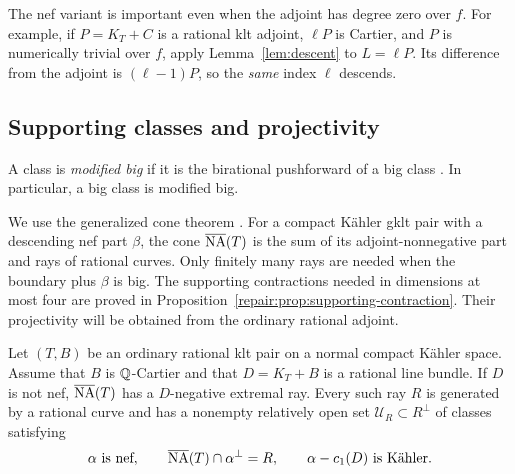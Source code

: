 The nef variant is important even when the adjoint has degree zero over
$f$.  For example, if $P=K_T+C$ is a rational klt adjoint, $\ell P$ is
Cartier, and $P$ is numerically trivial over $f$, apply
Lemma~\ref{lem:descent} to $L=\ell P$.  Its difference from the adjoint
is $(\ell-1)P$, so the \emph{same} index $\ell$ descends.

\subsection{Supporting classes and projectivity}

A class is \emph{modified big} if it is the birational pushforward of a big class
\cite[Definition~2.8]{HX2026}. In particular, a big class is modified big.

We use the generalized cone theorem
\cite[Theorem~1.3]{HX2026}. For a compact K\"ahler gklt pair with a
descending nef part $\beta$, the cone $\overline{\mathrm{NA}}(T)$ is the sum of its
adjoint-nonnegative part and rays of rational curves. Only finitely many
rays are needed when the boundary plus $\beta$ is big. The supporting
contractions needed in dimensions at most four are proved in
Proposition~\ref{repair:prop:supporting-contraction}. Their projectivity
will be obtained from the ordinary rational adjoint.

\begin{lemma}\label{lem:absolute-support}
Let $(T,B)$ be an ordinary rational klt pair on a normal compact K\"ahler
space.  Assume that $B$ is $\mathbb Q$-Cartier and that $D=K_T+B$ is a rational
line bundle.  If $D$ is not nef, $\overline{\mathrm{NA}}(T)$ has a $D$-negative extremal ray.
Every such ray $R$ is generated by a rational curve and has a nonempty
relatively open set $\mathcal U_R\subset R^\perp$ of classes satisfying
\begin{equation}\label{eq:absolute-support}
 \alpha\text{ is nef},\qquad
 \overline{\mathrm{NA}}(T)\cap\alpha^\perp=R,\qquad
 \alpha-c_1(D)\text{ is K\"ahler}.
\end{equation}
\end{lemma}

